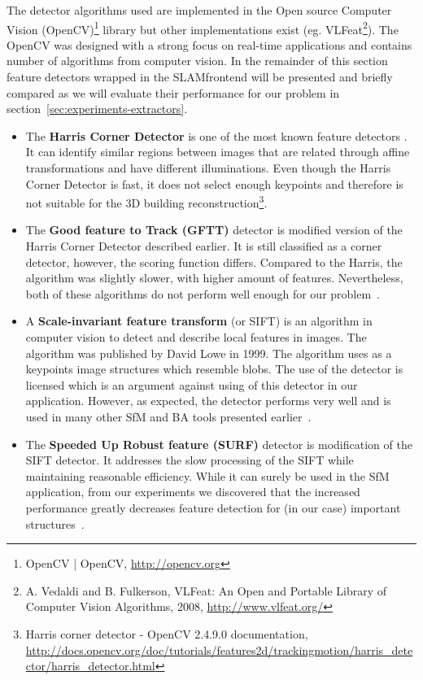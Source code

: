 The detector algorithms used are implemented in the Open source Computer Vision (OpenCV)\footnote{OpenCV | OpenCV, \url{http://opencv.org}} library but other implementations exist (eg. VLFeat\footnote{A. Vedaldi and B. Fulkerson, VLFeat: An Open and Portable Library of Computer Vision Algorithms, 2008, \url{http://www.vlfeat.org/}}). The OpenCV was designed with a strong focus on real-time applications and contains number of algorithms from computer vision. In the remainder of this section feature detectors wrapped in the SLAM\textunderscore frontend will be presented and briefly compared as we will evaluate their performance for our problem in section~\ref{sec:experiments-extractors}.

	
\begin{itemize}
	\item[1.] The \textbf{Harris Corner Detector} is one of the most known feature detectors . It can identify similar regions between images that are related through affine transformations and have different illuminations. Even though the Harris Corner Detector is fast, it does not select enough keypoints and therefore is not suitable for the 3D building reconstruction\footnote{Harris corner detector - OpenCV 2.4.9.0 documentation, \url{http://docs.opencv.org/doc/tutorials/features2d/trackingmotion/harris_detector/harris_detector.html}}.
	
	\item[2.] The \textbf{Good feature to Track (GFTT)} detector is modified version of the Harris Corner Detector described earlier. It is still classified as a corner detector, however, the scoring function differs. Compared to the Harris, the algorithm was slightly slower, with higher amount of features. Nevertheless, both of these algorithms do not perform well enough for our problem~\cite{article:gftt}.
	
	\item[3.] A \textbf{Scale-invariant feature transform} (or SIFT) is an algorithm in computer vision to detect and describe local features in images. The algorithm was published by David Lowe in 1999. The algorithm uses as a keypoints image structures which resemble blobs. The use of the detector is licensed which is an argument against using of this detector in our application. However, as expected, the detector performs very well and is used in many other SfM and BA tools presented earlier~\cite{article:sift}.
	
	\item[4.] The \textbf{Speeded Up Robust feature (SURF)} detector is modification of the SIFT detector. It addresses the slow processing of the SIFT while maintaining reasonable efficiency. While it can surely be used in the SfM application, from our experiments we discovered that the increased performance greatly decreases feature detection for (in our case) important structures~\cite{surf}.
	

\end{itemize}
